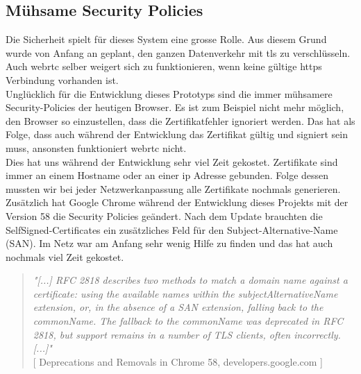 \subsection{Mühsame Security Policies}
Die Sicherheit spielt für dieses System eine grosse Rolle. Aus diesem Grund wurde von Anfang an geplant, den ganzen Datenverkehr mit \gls{tls} zu verschlüsseln. Auch \gls{webrtc} selber weigert sich zu funktionieren, wenn keine gültige \gls{https} Verbindung vorhanden ist.
\\
Unglücklich für die Entwicklung dieses Prototyps sind die immer mühsamere Security-Policies der heutigen Browser. Es ist zum Beispiel nicht mehr möglich, den Browser so einzustellen, dass die Zertifikatfehler ignoriert werden. Das hat als Folge, dass auch während der Entwicklung das Zertifikat gültig und signiert sein muss, ansonsten funktioniert \gls{webrtc} nicht.
\\
Dies hat uns während der Entwicklung sehr viel Zeit gekostet. Zertifikate sind immer an einem Hostname oder an einer \gls{ip} Adresse gebunden. Folge dessen mussten wir bei jeder Netzwerkanpassung alle Zertifikate nochmals generieren.
\\
Zusätzlich hat Google Chrome während der Entwicklung dieses Projekts mit der
Version 58 die Security Policies geändert. Nach dem Update brauchten die SelfSigned-Certificates ein zusätzliches Feld für den Subject-Alternative-Name (SAN). Im Netz war am Anfang sehr wenig Hilfe zu finden und das hat auch nochmals viel Zeit gekostet.


\begin{quote}
	\textit{
		"[...] RFC 2818 describes two methods to match a domain name against a certificate: using the available names within the subjectAlternativeName extension, or, in the absence of a SAN extension, falling back to the commonName. The fallback to the commonName was deprecated in RFC 2818, but support remains in a number of TLS clients, often incorrectly. [...]"
	} 
	\\
	\nocite{} [ Deprecations and Removals in Chrome 58, developers.google.com ]
\end{quote}

